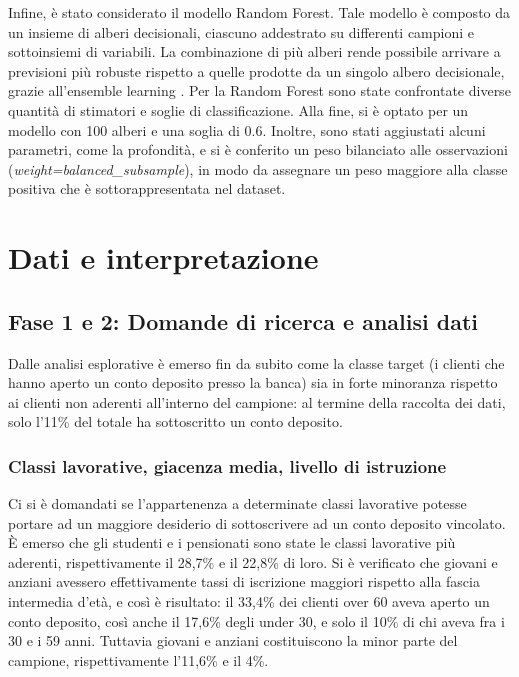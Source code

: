 \documentclass[11,5pt, a4paper]{article}
\begin{document}
Infine, è stato considerato il modello Random Forest. Tale modello è composto da un insieme di alberi decisionali, ciascuno addestrato su differenti campioni e sottoinsiemi di variabili. La combinazione di più alberi rende possibile arrivare a previsioni più robuste rispetto a quelle prodotte da un singolo albero decisionale, grazie all'ensemble learning \citep{RF_IBM}.
Per la Random Forest sono state confrontate diverse quantità di stimatori e soglie di classificazione. Alla fine, si è optato per un modello con 100 alberi e una soglia di 0.6. Inoltre, sono stati aggiustati alcuni parametri, come la profondità, e si è conferito un peso bilanciato alle osservazioni (\textit{weight=balanced\_subsample}), in modo da assegnare un peso maggiore alla classe positiva che è sottorappresentata nel dataset.

\section{Dati e interpretazione}

\subsection{Fase 1 e 2: Domande di ricerca e analisi dati}
Dalle analisi esplorative è emerso fin da subito come la classe target (i clienti che hanno aperto un conto deposito presso la banca) sia in forte minoranza rispetto ai clienti non aderenti all'interno del campione: al termine della raccolta dei dati, solo l’11\% del totale ha sottoscritto un conto deposito. 

\subsubsection{Classi lavorative, giacenza media, livello di istruzione}

Ci si è domandati se l'appartenenza a determinate classi lavorative potesse portare ad un maggiore desiderio di sottoscrivere ad un conto deposito vincolato.
È emerso che gli studenti e i pensionati sono state le classi lavorative più aderenti, rispettivamente il 28,7\% e il 22,8\% di loro. Si è verificato che giovani e anziani avessero effettivamente tassi di iscrizione maggiori rispetto alla fascia intermedia d'età, e così è risultato: il 33,4\% dei clienti over 60 aveva aperto un conto deposito, così anche il 17,6\% degli under 30, e solo il 10\% di chi aveva fra i 30 e i 59 anni. 
Tuttavia giovani e anziani costituiscono la minor parte del campione, rispettivamente l'11,6\% e il 4\%. 
\end{document}
